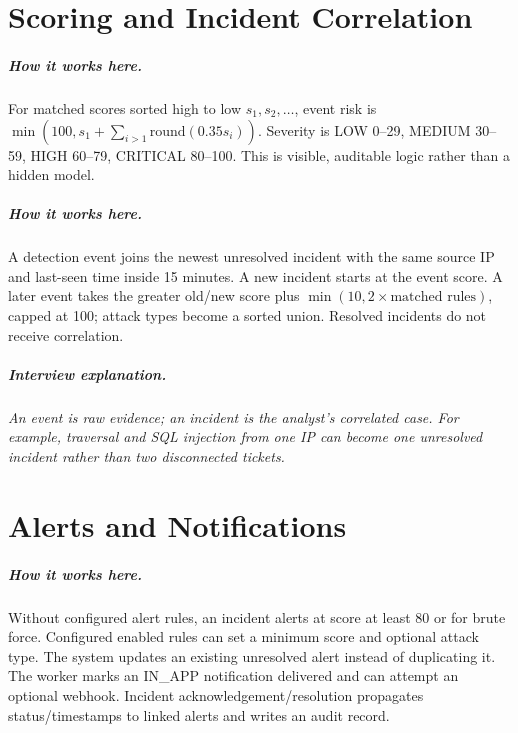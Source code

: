 \documentclass[11pt,oneside]{book}
\newcommand{\how}[1]{\paragraph{How it works here.}#1}
\newcommand{\interview}[1]{\paragraph{Interview explanation.}\emph{#1}}
\begin{document}
\chapter{Scoring and Incident Correlation}
\how{For matched scores sorted high to low \(s_1,s_2,\ldots\), event risk is \(\min(100, s_1 + \sum_{i>1}\mathrm{round}(0.35s_i))\). Severity is LOW 0--29, MEDIUM 30--59, HIGH 60--79, CRITICAL 80--100. This is visible, auditable logic rather than a hidden model.}\how{A detection event joins the newest unresolved incident with the same source IP and last-seen time inside 15 minutes. A new incident starts at the event score. A later event takes the greater old/new score plus \(\min(10,2\times\text{matched rules})\), capped at 100; attack types become a sorted union. Resolved incidents do not receive correlation.}
\interview{An event is raw evidence; an incident is the analyst's correlated case. For example, traversal and SQL injection from one IP can become one unresolved incident rather than two disconnected tickets.}

\chapter{Alerts and Notifications}
\how{Without configured alert rules, an incident alerts at score at least 80 or for brute force. Configured enabled rules can set a minimum score and optional attack type. The system updates an existing unresolved alert instead of duplicating it. The worker marks an IN\_APP notification delivered and can attempt an optional webhook. Incident acknowledgement/resolution propagates status/timestamps to linked alerts and writes an audit record.}
\end{document}
